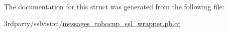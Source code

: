 The documentation for this struct was generated from the following file\-:\begin{DoxyCompactItemize}
\item 
3rdparty/sslvision/\hyperlink{messages__robocup__ssl__wrapper_8pb_8cc}{messages\-\_\-robocup\-\_\-ssl\-\_\-wrapper.\-pb.\-cc}\end{DoxyCompactItemize}
